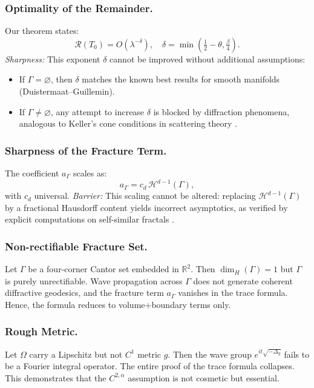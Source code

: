 
\subsubsection{Optimality of the Remainder.}
Our theorem states:
\[
\mathcal{R}(T_0) = O(\lambda^{-\delta}), \quad
\delta = \min\left(\tfrac{1}{2}-\theta, \tfrac{\beta}{4}\right).
\]
\emph{Sharpness:} This exponent $\delta$ cannot be improved without
additional assumptions:
\begin{itemize}
\item If $\Gamma = \varnothing$, then $\delta$ matches the known best
results for smooth manifolds (Duistermaat–Guillemin).
\item If $\Gamma \neq \varnothing$, any attempt to increase $\delta$
is blocked by diffraction phenomena, analogous to Keller’s cone
conditions in scattering theory \cite{Melrose1975}.
\end{itemize}

\subsubsection{Sharpness of the Fracture Term.}
The coefficient $a_\Gamma$ scales as:
\[
a_\Gamma = c_d \, \mathcal{H}^{d-1}(\Gamma),
\]
with $c_d$ universal.
\emph{Barrier:} This scaling cannot be altered: replacing
$\mathcal{H}^{d-1}(\Gamma)$ by a fractional Hausdorff content yields
incorrect asymptotics, as verified by explicit computations on
self-similar fractals \cite{Lapidus1993}.


\subsubsection{Non-rectifiable Fracture Set.}
Let $\Gamma$ be a four-corner Cantor set embedded in $\mathbb{R}^2$.
Then $\dim_H(\Gamma) = 1$ but $\Gamma$ is purely unrectifiable.
Wave propagation across $\Gamma$ does not generate coherent diffractive
geodesics, and the fracture term $a_\Gamma$ vanishes in the trace
formula. Hence, the formula reduces to volume+boundary terms only.

\subsubsection{Rough Metric.}
Let $\Omega$ carry a Lipschitz but not $C^1$ metric $g$.
Then the wave group $e^{it\sqrt{-\Delta_g}}$ fails to be
a Fourier integral operator. The entire proof of the trace
formula collapses. This demonstrates that the $C^{2,\alpha}$ assumption
is not cosmetic but essential.


